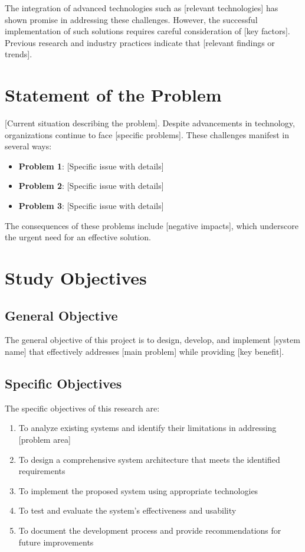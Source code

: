 \documentclass[12pt,twoside]{report}
\begin{document}
The integration of advanced technologies such as [relevant technologies] has shown promise in addressing these challenges. However, the successful implementation of such solutions requires careful consideration of [key factors]. Previous research and industry practices indicate that [relevant findings or trends].

\section{Statement of the Problem}
[Current situation describing the problem]. Despite advancements in technology, organizations continue to face [specific problems]. These challenges manifest in several ways:

\begin{itemize}
    \item \textbf{Problem 1}: [Specific issue with details]
    \item \textbf{Problem 2}: [Specific issue with details]
    \item \textbf{Problem 3}: [Specific issue with details]
\end{itemize}

The consequences of these problems include [negative impacts], which underscore the urgent need for an effective solution.

\section{Study Objectives}
\subsection{General Objective}
The general objective of this project is to design, develop, and implement [system name] that effectively addresses [main problem] while providing [key benefit].

\subsection{Specific Objectives}
The specific objectives of this research are:
\begin{enumerate}
    \item To analyze existing systems and identify their limitations in addressing [problem area]
    \item To design a comprehensive system architecture that meets the identified requirements
    \item To implement the proposed system using appropriate technologies
    \item To test and evaluate the system's effectiveness and usability
    \item To document the development process and provide recommendations for future improvements
\end{enumerate}
\end{document}
